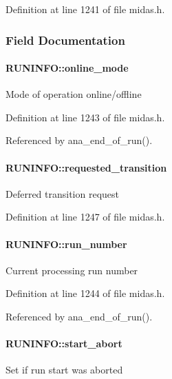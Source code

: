 Definition at line 1241 of file midas.h.

\subsubsection{Field Documentation}
\paragraph[{online\_\-mode}]{ {\bf RUNINFO::online\_\-mode}}\hfill\label{structRUNINFO_a993c515f2187c544e338bf06c7064ec3}
Mode of operation online/offline 

Definition at line 1243 of file midas.h.

Referenced by ana\_\-end\_\-of\_\-run().
\paragraph[{requested\_\-transition}]{ {\bf RUNINFO::requested\_\-transition}}\hfill\label{structRUNINFO_a2a4b8247ea78b5463c30f427460cd16e}
Deferred transition request 

Definition at line 1247 of file midas.h.
\paragraph[{run\_\-number}]{ {\bf RUNINFO::run\_\-number}}\hfill\label{structRUNINFO_ae34f31b041d6b30e555170811ef376ee}
Current processing run number 

Definition at line 1244 of file midas.h.

Referenced by ana\_\-end\_\-of\_\-run().
\paragraph[{start\_\-abort}]{ {\bf RUNINFO::start\_\-abort}}\hfill\label{structRUNINFO_ad651ba8d57963be72f85c87aebdc4b22}
Set if run start was aborted 

